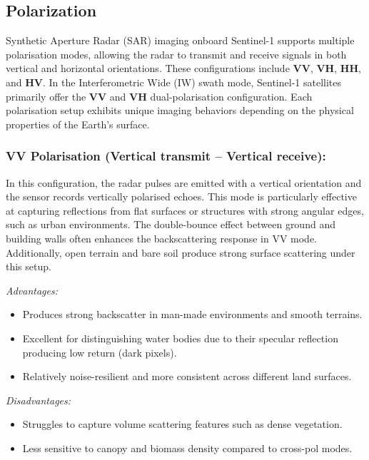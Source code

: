 \subsection{Polarization}

Synthetic Aperture Radar (SAR) imaging onboard Sentinel-1 supports multiple polarisation modes, allowing the radar to transmit and receive signals in both vertical and horizontal orientations. These configurations include \textbf{VV}, \textbf{VH}, \textbf{HH}, and \textbf{HV}. In the Interferometric Wide (IW) swath mode, Sentinel-1 satellites primarily offer the \textbf{VV} and \textbf{VH} dual-polarisation configuration. Each polarisation setup exhibits unique imaging behaviors depending on the physical properties of the Earth's surface.

\subsubsection{\textbf{VV Polarisation (Vertical transmit – Vertical receive):}}

In this configuration, the radar pulses are emitted with a vertical orientation and the sensor records vertically polarised echoes. This mode is particularly effective at capturing reflections from flat surfaces or structures with strong angular edges, such as urban environments. The double-bounce effect between ground and building walls often enhances the backscattering response in VV mode. Additionally, open terrain and bare soil produce strong surface scattering under this setup.


\textit{Advantages:}
\begin{itemize}
    \item Produces strong backscatter in man-made environments and smooth terrains.
    \item Excellent for distinguishing water bodies due to their specular reflection producing low return (dark pixels).
    \item Relatively noise-resilient and more consistent across different land surfaces.
\end{itemize}

\textit{Disadvantages:}
\begin{itemize}
    \item Struggles to capture volume scattering features such as dense vegetation.
    \item Less sensitive to canopy and biomass density compared to cross-pol modes.
\end{itemize}

